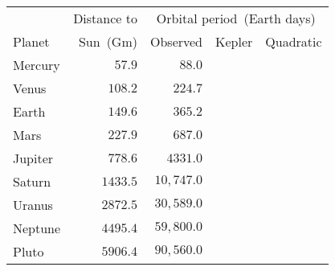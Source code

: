 \begin{tabular}{lrrrr}                                                 \toprule
        & Distance to & \multicolumn{3}{c}{Orbital period~(Earth days)} \\
  \cmidrule{3-5}
Planet  & Sun~(Gm)    & Observed  & Kepler & Quadratic \\\midrule
Mercury & $57.9$                  & $88.0$     \\[4pt]
Venus   & $108.2$                 & $224.7$    \\[4pt]
Earth   & $149.6$                 & $365.2$    \\[4pt]
Mars    & $227.9$                 & $687.0$    \\[4pt]
Jupiter & $778.6$                 & $4331.0$   \\[4pt]
Saturn  & $1433.5$                & $10,747.0$ \\[4pt]
Uranus  & $2872.5$                & $30,589.0$ \\[4pt]
Neptune & $4495.4$                & $59,800.0$ \\[4pt]
Pluto   & $5906.4$                & $90,560.0$ \\\bottomrule
\end{tabular}
